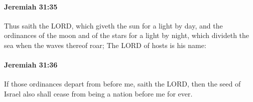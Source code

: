 		\paragraph{Jeremiah 31:35} %
			\label{JEREMIAH-31-35}

			Thus saith the LORD, which giveth the sun for a light by day, and the ordinances of the moon and of the stars for a light by night, which divideth the sea when the waves thereof roar; The LORD of hosts is his name:


		\paragraph{Jeremiah 31:36} %
			\label{JEREMIAH-31-36}

			If those ordinances depart from before me, saith the LORD, then the seed of Israel also shall cease from being a nation before me for ever.


